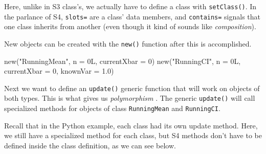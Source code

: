 \documentclass[
  12pt,
  krantz2]{krantz}
\makeatletter
\newenvironment{Shaded}{\begin{snugshade}}{\end{snugshade}}
\newcommand{\AttributeTok}[1]{\textcolor[rgb]{0.61,0.61,0.61}{#1}}
\newcommand{\DecValTok}[1]{\textcolor[rgb]{0.06,0.06,0.06}{#1}}
\newcommand{\FloatTok}[1]{\textcolor[rgb]{0.06,0.06,0.06}{#1}}
\newcommand{\FunctionTok}[1]{\textcolor[rgb]{0,0,0}{#1}}
\newcommand{\NormalTok}[1]{#1}
\newcommand{\StringTok}[1]{\textcolor[rgb]{0.5,0.5,0.5}{#1}}
\newenvironment{kframe}{%
\medskip{}
\setlength{\fboxsep}{.8em}
 \def\at@end@of@kframe{}%
 \ifinner\ifhmode%
  \def\at@end@of@kframe{\end{minipage}}%
  \begin{minipage}{\columnwidth}%
 \fi\fi%
 \def\FrameCommand##1{\hskip\@totalleftmargin \hskip-\fboxsep
 \colorbox{shadecolor}{##1}\hskip-\fboxsep
     \hskip-\linewidth \hskip-\@totalleftmargin \hskip\columnwidth}%
 \MakeFramed {\advance\hsize-\width
   \@totalleftmargin\z@ \linewidth\hsize
   \@setminipage}}%
 {\par\unskip\endMakeFramed%
 \at@end@of@kframe}
\renewenvironment{Shaded}{\begin{kframe}}{\end{kframe}}
\makeatother
\begin{document}
Here, unlike in S3 class's, we actually have to define a class with \texttt{setClass()}. In the parlance of S4, \texttt{slots=} are a class' data members, and \texttt{contains=} signals that one class inherits from another (even though it kind of sounds like \emph{composition}).

New objects can be created with the \texttt{new()} function after this is accomplished.

\begin{Shaded}
\begin{Highlighting}[]
\FunctionTok{new}\NormalTok{(}\StringTok{"RunningMean"}\NormalTok{, }\AttributeTok{n =}\NormalTok{ 0L, }\AttributeTok{currentXbar =} \DecValTok{0}\NormalTok{)}
\FunctionTok{new}\NormalTok{(}\StringTok{"RunningCI"}\NormalTok{, }\AttributeTok{n =}\NormalTok{ 0L, }\AttributeTok{currentXbar =} \DecValTok{0}\NormalTok{, }\AttributeTok{knownVar =} \FloatTok{1.0}\NormalTok{)}
\end{Highlighting}
\end{Shaded}

Next we want to define an \texttt{update()} generic function that will work on objects of both types. This is what gives us \emph{polymorphism} . The generic \texttt{update()} will call specialized methods for objects of class \texttt{RunningMean} and \texttt{RunningCI}.

Recall that in the Python example, each class had its own update method. Here, we still have a specialized method for each class, but S4 methods don't have to be defined inside the class definition, as we can see below.
\end{document}
